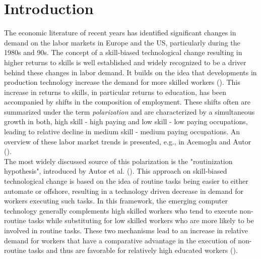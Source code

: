 \documentclass[../main.tex]{subfiles}
\begin{document}
\section{Introduction}
\label{sec:introduction}
The economic literature of recent years has identified significant changes in demand on the labor markets in Europe and the US, particularly during the 1980s and 90s. 
The concept of a skill-biased technological change resulting in higher returns to skills is well established and widely recognized to be a driver behind these changes in labor demand. It builds on the idea that developments in production technology increase the demand for more skilled workers (\cite{acemoglu2011skills}).
This increase in returns to skills, in particular returns to education, has been accompanied by shifts in the composition of employment. These shifts often are summarized under the term \textit{polarization} and are characterized by a simultaneous growth in both, high skill - high paying and low skill - low paying occupations, leading to relative decline in medium skill - medium paying occupations. An overview of these labor market trends is presented, e.g., in Acemoglu and Autor (\citeyear{acemoglu2011skills}).
\\
The most widely discussed source of this polarization is the "routinization hypothesis", introduced by Autor et al. (\citeyear{autor2003skill}). This approach on skill-biased technological change is based on the idea of routine tasks being easier to either automate or offshore, resulting in a technology driven decrease in demand for workers executing such tasks. In this framework, the emerging computer technology generally complements high skilled workers who tend to execute non-routine tasks while substituting for low skilled workers who are more likely to be involved in routine tasks. These two mechanisms lead to an increase in relative demand for workers that have a comparative advantage in the execution of non-routine tasks and thus are favorable for relatively high educated workers (\cite{autor2003skill}). 
\end{document}
